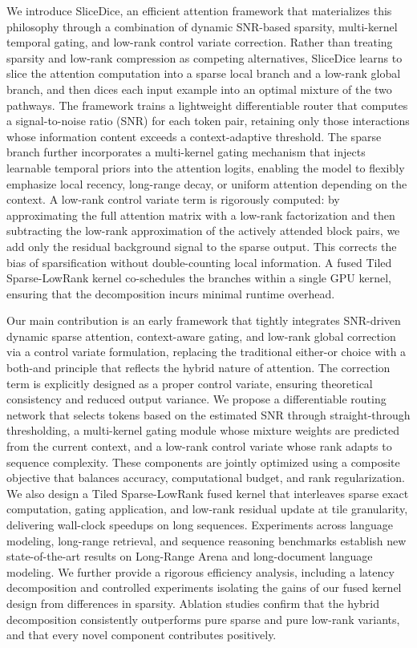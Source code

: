 \documentclass{article}
\begin{document}
We introduce SliceDice, an efficient attention framework that materializes this philosophy through a combination of dynamic SNR-based sparsity, multi-kernel temporal gating, and low-rank control variate correction. Rather than treating sparsity and low-rank compression as competing alternatives, SliceDice learns to slice the attention computation into a sparse local branch and a low-rank global branch, and then dices each input example into an optimal mixture of the two pathways. The framework trains a lightweight differentiable router that computes a signal-to-noise ratio (SNR) for each token pair, retaining only those interactions whose information content exceeds a context-adaptive threshold. The sparse branch further incorporates a multi-kernel gating mechanism that injects learnable temporal priors into the attention logits, enabling the model to flexibly emphasize local recency, long-range decay, or uniform attention depending on the context. A low-rank control variate term is rigorously computed: by approximating the full attention matrix with a low-rank factorization and then subtracting the low-rank approximation of the actively attended block pairs, we add only the residual background signal to the sparse output. This corrects the bias of sparsification without double-counting local information. A fused Tiled Sparse-LowRank kernel co-schedules the branches within a single GPU kernel, ensuring that the decomposition incurs minimal runtime overhead.

Our main contribution is an early framework that tightly integrates SNR-driven dynamic sparse attention, context-aware gating, and low-rank global correction via a control variate formulation, replacing the traditional either-or choice with a both-and principle that reflects the hybrid nature of attention. The correction term is explicitly designed as a proper control variate, ensuring theoretical consistency and reduced output variance. We propose a differentiable routing network that selects tokens based on the estimated SNR through straight-through thresholding, a multi-kernel gating module whose mixture weights are predicted from the current context, and a low-rank control variate whose rank adapts to sequence complexity. These components are jointly optimized using a composite objective that balances accuracy, computational budget, and rank regularization. We also design a Tiled Sparse-LowRank fused kernel that interleaves sparse exact computation, gating application, and low-rank residual update at tile granularity, delivering wall-clock speedups on long sequences. Experiments across language modeling, long-range retrieval, and sequence reasoning benchmarks establish new state-of-the-art results on Long-Range Arena and long-document language modeling. We further provide a rigorous efficiency analysis, including a latency decomposition and controlled experiments isolating the gains of our fused kernel design from differences in sparsity. Ablation studies confirm that the hybrid decomposition consistently outperforms pure sparse and pure low-rank variants, and that every novel component contributes positively.
\end{document}
